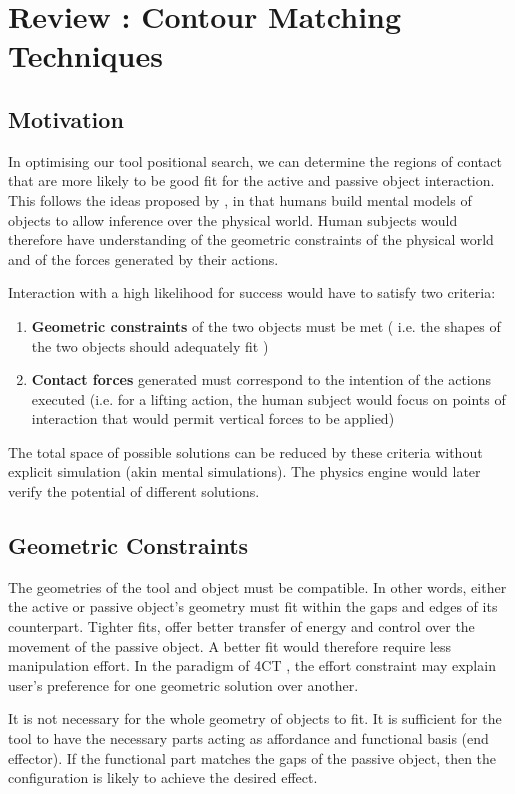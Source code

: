 \documentclass[11]{article}
\begin{document}
\section{Review : Contour Matching Techniques}

\subsection{Motivation}
In optimising our tool positional search, we can determine the regions of contact that are more likely to be good fit for the active and passive object interaction. This follows the ideas proposed by \cite{battaglia2013}, in that humans build mental models of objects to allow inference over  the physical world. Human subjects would therefore have understanding of the geometric constraints of the physical world and of the forces generated by their actions.

Interaction with a high likelihood for success would have to satisfy two criteria: 
\begin{enumerate}
\item \textbf{Geometric constraints} of the two objects must be met ( i.e. the shapes of the two objects should adequately fit )
\item \textbf{Contact forces} generated must correspond to the intention of the actions executed (i.e. for a lifting action, the human subject would focus on points of interaction that would permit vertical forces to be applied)
\end{enumerate}

The total space of possible solutions can be reduced by these criteria without explicit simulation (akin mental simulations\cite{osiurak2014}). The physics engine would later verify the potential of different solutions. 

\subsection{Geometric Constraints}
The geometries of the tool and object must be compatible. In other words, either the active or passive object's geometry must fit within the gaps and edges of its counterpart. Tighter fits, offer better transfer of energy and control over the movement of the passive object. A better fit would therefore require less manipulation effort. In the paradigm of 4CT \cite{osiurak2014}, the effort constraint may explain user's preference for one geometric solution over another.

It is not necessary for the whole geometry of objects to fit. It is sufficient for the tool to have the necessary parts acting as affordance and functional basis (end effector\cite{zhu2015}). If the functional part matches the gaps of the passive object, then the configuration is likely to achieve the desired effect. 
\end{document}
